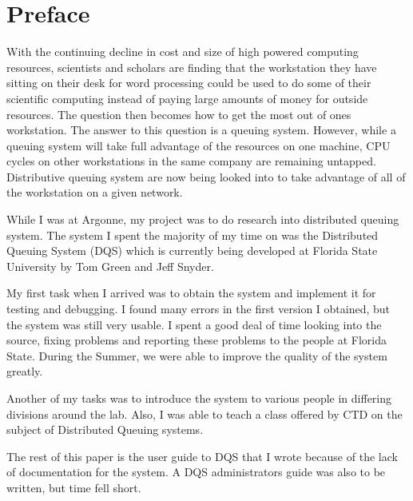 \section {Preface}

With the continuing decline in cost and size of high powered computing
resources, scientists and scholars are finding that the workstation they
have sitting on their desk for word processing could be used to do some of
their scientific computing instead of paying large amounts of money for
outside resources.  The question then becomes how to get the most out of
ones workstation.  The answer to this question is a queuing system.
However, while a queuing system will take full advantage of the resources
on one machine, CPU cycles on other workstations in the same company are
remaining untapped.  Distributive queuing system are now being looked into
to take advantage of all of the workstation on a given network.

While I was at Argonne, my project was to do research into distributed
queuing system.  The system I spent the majority of my time on was the
Distributed Queuing System (DQS) which is currently being developed at
Florida State University by Tom Green and Jeff Snyder.

My first task when I arrived was to obtain the system and implement it for
testing and debugging.  I found many errors in the first version I
obtained, but the system was still very usable.  I spent a good deal of
time looking into the source, fixing problems and reporting these problems
to the people at Florida State.  During the Summer, we were able to improve
the quality of the system greatly.  

Another of my tasks was to introduce the system to various people in
differing divisions around the lab.  Also, I was able to teach a class
offered by CTD on the subject of Distributed Queuing systems.

The rest of this paper is the user guide to DQS that I wrote because of the
lack of documentation for the system.  A DQS administrators guide was also
to be written, but time fell short.
